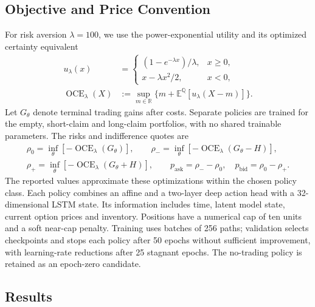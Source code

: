\documentclass[11pt]{article}
\newcommand{\R}{\mathbb R}
\newcommand{\E}{\mathbb E}
\newcommand{\Q}{\mathbb Q}
\theoremstyle{plain}
\theoremstyle{definition}
\theoremstyle{remark}
\begin{document}
\subsection{Objective and Price Convention}
\label{sec:deep-hedging-objective}

For risk aversion $\lambda=100$, we use the power-exponential utility and
its optimized certainty equivalent
\begin{equation}
  \begin{aligned}
    u_\lambda(x)&=
    \begin{cases}
      (1-e^{-\lambda x})/\lambda,&x\geq0,\\
      x-\lambda x^2/2,&x<0,
    \end{cases}\\
    \operatorname{OCE}_\lambda(X)
      &:=\sup_{m\in\R}\{m+\E^\Q[u_\lambda(X-m)]\}.
  \end{aligned}
  \label{eq:deep-hedging-power-oce}
\end{equation}
Let $G_\theta$ denote terminal trading gains after costs.  Separate policies
are trained for the empty, short-claim and long-claim portfolios, with no
shared trainable parameters.  The risks and indifference quotes are
\begin{equation}
  \begin{gathered}
    \rho_0=\inf_\theta[-\operatorname{OCE}_\lambda(G_\theta)],\qquad
    \rho_-=\inf_\theta[-\operatorname{OCE}_\lambda(G_\theta-H)],\\
    \rho_+=\inf_\theta[-\operatorname{OCE}_\lambda(G_\theta+H)],\qquad
    p_{\mathrm{ask}}=\rho_--\rho_0,\quad
    p_{\mathrm{bid}}=\rho_0-\rho_+.
  \end{gathered}
  \label{eq:deep-hedging-indifference-quotes}
\end{equation}
The reported values approximate these optimizations within the chosen
policy class.  Each policy combines an affine and a two-layer deep action
head with a 32-dimensional LSTM state.  Its information includes time,
latent model state, current option prices and inventory.  Positions have
a numerical cap of ten units and a soft near-cap penalty.  Training uses
batches of 256 paths; validation selects checkpoints and stops each
policy after 50 epochs without sufficient improvement, with learning-rate
reductions after 25 stagnant epochs.  The no-trading policy is retained
as an epoch-zero candidate.

\subsection{Results}
\label{sec:deep-hedging-results}
\end{document}
